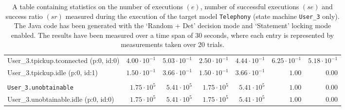 \begin{table}[htbp]
{\begin{tabular}{lrrrrrr}
\hspace{3mm}User\_3.tpickup.tconnected (p:0, id:0)    & $4.00 \cdot 10^{-1}$ & $5.03 \cdot 10^{-1}$ & $2.50 \cdot 10^{-1}$ & $4.44 \cdot 10^{-1}$ & $6.25 \cdot 10^{-1}$ & $5.18 \cdot 10^{-1}$ \\
\hspace{3mm}User\_3.tpickup.idle (p:0, id:1)          & $1.50 \cdot 10^{-1}$ & $3.66 \cdot 10^{-1}$ & $1.50 \cdot 10^{-1}$ & $3.66 \cdot 10^{-1}$ &               $1.00$ &               $0.00$ \\
\\[-8pt]\texttt{User\_3.unobtainable}                 &  $1.75 \cdot 10^{5}$ &  $5.41 \cdot 10^{5}$ &  $1.75 \cdot 10^{5}$ &  $5.41 \cdot 10^{5}$ &               $1.00$ &               $0.00$ \\
\hspace{3mm}User\_3.unobtainable.idle (p:0, id:0)     &  $1.75 \cdot 10^{5}$ &  $5.41 \cdot 10^{5}$ &  $1.75 \cdot 10^{5}$ &  $5.41 \cdot 10^{5}$ &               $1.00$ &               $0.00$ \\
\bottomrule
\end{tabular}
}
\caption{A table containing statistics on the number of executions $(e)$, number of successful executions $(se)$ and success ratio $(sr)$ measured during the execution of the target model \texttt{Telephony} (state machine \texttt{User\_3} only). The Java code has been generated with the `Random + Det' decision mode and `Statement' locking mode enabled. The results have been measured over a time span of 30 seconds, where each entry is represented by measurements taken over 20 trials.}
\label{table:frequency_results_telephony_random_det_statement_user_3}
\end{table}